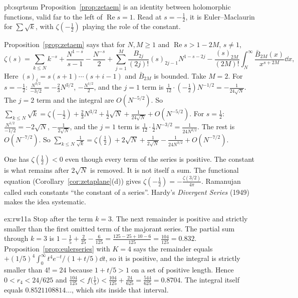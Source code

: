\begin{solution}{pb:sqrtsum}
\idea Proposition~\ref{prop:zetaem} is an identity between holomorphic functions, valid far to the left of $\operatorname{Re}s=1$. Read at $s=-\frac12$, it is Euler--Maclaurin for $\sum\sqrt k$, with $\zeta(-\frac12)$ playing the role of the constant.

\writeup Proposition~\ref{prop:zetaem} says that for $N,M\ge1$ and $\operatorname{Re}s>1-2M$, $s\ne1$,
\[
\zeta(s)=\sum_{k\le N}k^{-s}+\frac{N^{1-s}}{s-1}-\frac{N^{-s}}2+\sum_{j=1}^M\frac{B_{2j}}{(2j)!}(s)_{2j-1}N^{1-s-2j}-\frac{(s)_{2M}}{(2M)!}\int_N^\infty\frac{\bar B_{2M}(x)}{x^{s+2M}}\dd x,
\]
Here $(s)_i=s(s+1)\cdots(s+i-1)$ and $\bar B_{2M}$ is bounded. Take $M=2$. For $s=-\frac12$: $\frac{N^{3/2}}{-3/2}=-\frac23N^{3/2}$, $-\frac{N^{1/2}}2$, and the $j=1$ term is $\frac1{12}\cdot(-\frac12)N^{-1/2}=-\frac1{24\sqrt N}$. The $j=2$ term and the integral are $O(N^{-5/2})$. So $\sum_{k\le N}\sqrt k=\zeta(-\frac12)+\frac23N^{3/2}+\frac12\sqrt N+\frac1{24\sqrt N}+O(N^{-5/2})$. For $s=\frac12$: $\frac{N^{1/2}}{-1/2}=-2\sqrt N$, $-\frac1{2\sqrt N}$, and the $j=1$ term is $\frac1{12}\cdot\frac12N^{-3/2}=\frac1{24N^{3/2}}$. The rest is $O(N^{-7/2})$. So $\sum_{k\le N}\frac1{\sqrt k}=\zeta(\frac12)+2\sqrt N+\frac1{2\sqrt N}-\frac1{24N^{3/2}}+O(N^{-7/2})$.

\leads One has $\zeta(\frac12)<0$ even though every term of the series is positive. The constant is what remains after $2\sqrt N$ is removed. It is not itself a sum. The functional equation (Corollary~\ref{cor:zetaplane}(d)) gives $\zeta(-\frac12)=-\frac{\zeta(3/2)}{4\pi}$. Ramanujan called such constants ``the constant of a series''. Hardy's \emph{Divergent Series} (1949) makes the idea systematic.
\end{solution}

\begin{solution}{ex:rw11a}
\idea Stop after the term $k=3$. The next remainder is positive and strictly smaller than the first omitted term of the majorant series.
\writeup The partial sum through $k=3$ is $1-\frac15+\frac{2}{25}-\frac{6}{125}=\frac{125-25+10-6}{125}=\frac{104}{125}=0.832$. Proposition~\ref{prop:eulerseries} with $K=4$ says the remainder equals $+(1/5)^4\int_0^\infty t^4e^{-t}/(1+t/5)\dd t$, so it is positive, and the integral is strictly smaller than $4!=24$ because $1+t/5>1$ on a set of positive length. Hence $0<r_4<24/625$ and $\frac{104}{125}<f\bigl(\frac15\bigr)<\frac{104}{125}+\frac{24}{625}=\frac{544}{625}=0.8704$. The integral itself equals $0.8521108814\ldots$, which sits inside that interval.
\end{solution}

